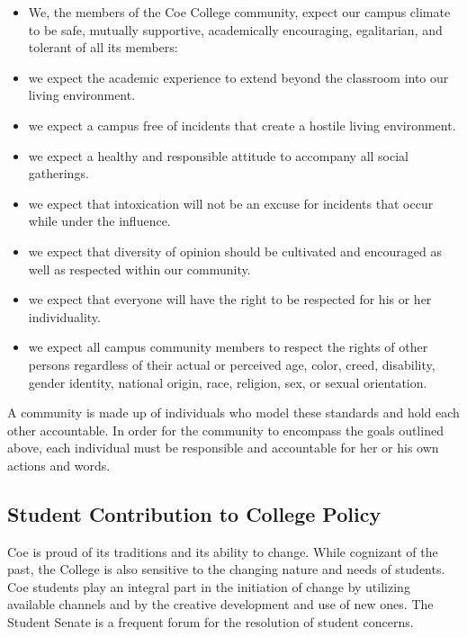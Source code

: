\documentclass[
  letterpaper,
]{scrbook}
\providecommand{\tightlist}{%
  \setlength{\itemsep}{0pt}\setlength{\parskip}{0pt}}
\begin{document}
\begin{itemize}
\tightlist
\item
  We, the members of the Coe College community, expect our campus
  climate to be safe, mutually supportive, academically encouraging,
  egalitarian, and tolerant of all its members:
\item
  we expect the academic experience to extend beyond the classroom into
  our living environment.
\item
  we expect a campus free of incidents that create a hostile living
  environment.
\item
  we expect a healthy and responsible attitude to accompany all social
  gatherings.
\item
  we expect that intoxication will not be an excuse for incidents that
  occur while under the influence.
\item
  we expect that diversity of opinion should be cultivated and
  encouraged as well as respected within our community.
\item
  we expect that everyone will have the right to be respected for his or
  her individuality.
\item
  we expect all campus community members to respect the rights of other
  persons regardless of their actual or perceived age, color, creed,
  disability, gender identity, national origin, race, religion, sex, or
  sexual orientation.
\end{itemize}

A community is made up of individuals who model these standards and hold
each other accountable. In order for the community to encompass the
goals outlined above, each individual must be responsible and
accountable for her or his own actions and words.

\hypertarget{student-contribution-to-college-policy}{%
\subsection{Student Contribution to College
Policy}\label{student-contribution-to-college-policy}}

Coe is proud of its traditions and its ability to change. While
cognizant of the past, the College is also sensitive to the changing
nature and needs of students. Coe students play an integral part in the
initiation of change by utilizing available channels and by the creative
development and use of new ones. The Student Senate is a frequent forum
for the resolution of student concerns.
\end{document}
